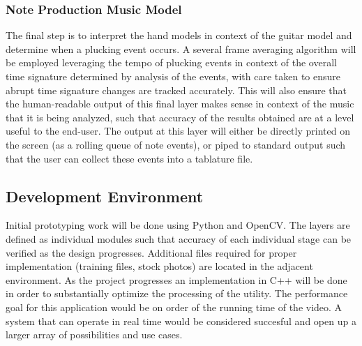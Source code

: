 \subsubsection{Note Production Music Model}
The final step is to interpret the hand models in context of the guitar model and determine when a plucking event occurs.
A several frame averaging algorithm will be employed leveraging the tempo of plucking events in context of the overall time
signature determined by analysis of the events, with care taken to ensure abrupt time signature changes are tracked accurately.
This will also ensure that the human-readable output of this final layer makes sense in context of the music that it is
being analyzed, such that accuracy of the results obtained are at a level useful to the end-user.
The output at this layer will either be directly printed on the screen (as a rolling queue of note events),
or piped to standard output such that the user can collect these events into a tablature file.

\subsection{Development Environment}
Initial prototyping work will be done using Python and OpenCV\cite{opencv}.
The layers are defined as individual modules such that accuracy of each individual stage can be verified as the design progresses.
Additional files required for proper implementation (training files, stock photos) are located in the adjacent environment.
As the project progresses an implementation in C++ will be done in order to substantially optimize the processing of the utility.
The performance goal for this application would be on order of the running time of the video.
A system that can operate in real time would be considered succesful and open up a larger array of possibilities and use cases.

